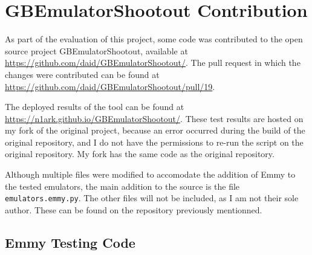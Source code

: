 
\chapter{GBEmulatorShootout Contribution}

As part of the evaluation of this project, some code was contributed to the open source project GBEmulatorShootout, available at \url{https://github.com/daid/GBEmulatorShootout/}. The pull request in which the changes were contributed can be found at \url{https://github.com/daid/GBEmulatorShootout/pull/19}.

The deployed results of the tool can be found at \url{https://n1ark.github.io/GBEmulatorShootout/}. These test results are hosted on my fork of the original project, because an error occurred during the build of the original repository, and I do not have the permissions to re-run the script on the original repository. My fork has the same code as the original repository.

Although multiple files were modified to accomodate the addition of Emmy to the tested emulators, the main addition to the source is the file \texttt{emulators.emmy.py}. The other files will not be included, as I am not their sole author. These can be found on the repository previously mentionned.

\section{Emmy Testing Code}

